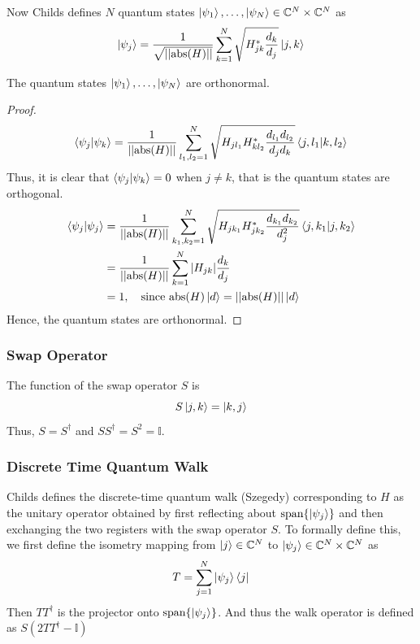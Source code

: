 \documentclass[
10pt, %
a4paper, %
oneside, %
headinclude,footinclude, %
BCOR5mm, %
]{scrartcl}
\begin{document}
Now Childs defines $N$ quantum states $\ket{\psi_1},\ldots,\ket{\psi_N}\in\mathbb{C}^N\times\mathbb{C}^N$ as
$$\ket{\psi_j}=\frac{1}{\sqrt{||\text{abs}(H)||}}\sum_{k=1}^N\sqrt{H_{jk}^*\frac{d_k}{d_j}}\ket{j,k}$$
\begin{theorem}
The quantum states $\ket{\psi_1},\ldots,\ket{\psi_N}$ are orthonormal.
\end{theorem}
\begin{proof}
$$\braket{\psi_j}{\psi_k}=\frac{1}{||\text{abs}(H)||}\sum_{l_1,l_2=1}^N\sqrt{H_{jl_1}H_{kl_2}^*\frac{d_{l_1}d_{l_2}}{d_jd_k}}\braket{j,l_1}{k,l_2}$$
Thus, it is clear that $\braket{\psi_j}{\psi_k}=0$ when $j\ne k$, that is the quantum states are orthogonal.
\begin{align*}
\centering
\braket{\psi_j}{\psi_j}&=\frac{1}{||\text{abs}(H)||}\sum_{k_1,k_2=1}^N\sqrt{H_{jk_1}H_{jk_2}^*\frac{d_{k_1}d_{k_2}}{d_j^2}}\braket{j,k_1}{j,k_2}\\
&=\frac{1}{||\text{abs}(H)||}\sum_{k=1}^N\abs{H_{jk}}\frac{d_k}{d_j}\\
&=1,\ \ \ \text{since }\text{abs}(H)\ket d=||\text{abs}(H)||\ket d
\end{align*}
Hence, the quantum states are orthonormal.
\end{proof}

\subsubsection{Swap Operator}
The function of the swap operator $S$ is
$$S\ket{j,k}=\ket{k,j}$$
Thus, $S=S^{\dagger}$ and $SS^{\dagger}=S^2=\mathbb{I}$.

\subsubsection{Discrete Time Quantum Walk}
Childs defines the discrete-time quantum walk (Szegedy) corresponding to $H$ as the unitary operator obtained
by first reflecting about $\text{span}\{\ket{\psi_j}\}$ and then exchanging the two registers with the swap operator $S$. To formally define this, we first define the isometry mapping from $\ket j\in\mathbb{C}^N$ to $\ket{\psi_j}\in\mathbb{C}^N\times\mathbb{C}^N$ as
$$T=\sum_{j=1}^N\ket{\psi_j}\bra j$$
Then $TT^{\dagger}$ is the projector onto $\text{span}\{\ket{\psi_j}\}$. And thus the walk operator is defined as $S(2TT^{\dagger}-\mathbb{I})$
\end{document}
